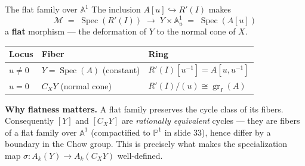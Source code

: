\documentclass[aspectratio=169,12pt]{beamer}
\begin{document}
\begin{frame}{The flat family over $\mathbb{A}^1$}
  The inclusion $A[u] \hookrightarrow R'(I)$ makes
  \[
    \mathcal{M} \;=\; \operatorname{Spec}(R'(I))
    \;\longrightarrow\;
    Y \times \mathbb{A}^1_u \;=\; \operatorname{Spec}(A[u])
  \]
  a \textbf{flat} morphism — the deformation of $Y$ to the normal cone of $X$.

  \medskip

  \renewcommand{\arraystretch}{1.45}
  \begin{tabular}{@{\hspace{4pt}}lll@{\hspace{4pt}}}
    \toprule
    \textbf{Locus} & \textbf{Fiber} & \textbf{Ring} \\
    \midrule
    $u \neq 0$ & $Y = \operatorname{Spec}(A)$ \enspace (constant)
               & $R'(I)[u^{-1}] = A[u, u^{-1}]$ \\
    $u = 0$    & $C_X Y$ \enspace (normal cone)
               & $R'(I)/(u) \cong \operatorname{gr}_I(A)$ \\
    \bottomrule
  \end{tabular}

  \smallskip

  \textbf{Why flatness matters.}\enspace
  A flat family preserves the cycle class of its fibers.
  Consequently $[Y]$ and $[C_X Y]$ are \emph{rationally equivalent} cycles —
  they are fibers of a flat family over $\mathbb{A}^1$
  (compactified to $\mathbb{P}^1$ in slide 33),
  hence differ by a boundary in the Chow group.
  This is precisely what makes the specialization map
  $\sigma : A_k(Y) \to A_k(C_X Y)$ well-defined.
\end{frame}
\end{document}
